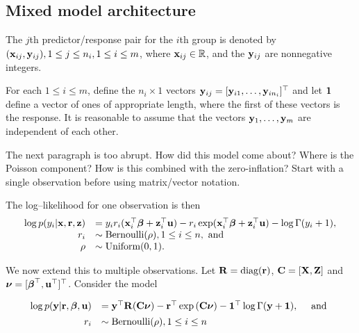 \documentclass[times, doublespace]{anzsauth}
\newcommand{\joc}[1]{{\color{red}#1}}
\begin{document}
\subsection{Mixed model architecture}

The $j$th predictor/response pair for the $i$th group is denoted by $({\bf x}_{ij}, {\bf y}_{ij}), 1 \leq j \leq n_i, 1 \leq i \leq m$, where ${\bf x}_{ij} \in {\mathbb{R}}$, and the ${\bf y}_{ij}$ are nonnegative integers.

\noindent For each $1 \leq i \leq m$, define the $n_i \times 1$ vectors ${\bf y}_{ij} = [{\bf y}_{i 1}, \ldots, {\bf y}_{i
	n_i}]^\top$ and let ${\bf 1}$ define a vector of ones of appropriate length, where the first of these vectors is
the response. It is reasonable to assume that the vectors ${\bf y}_1, \ldots, {\bf y}_m$ are independent of each
other.

\joc{The next paragraph is too abrupt. How did this model come about? Where is the Poisson component? How is this combined with the zero-inflation?
Start with a single observation before using matrix/vector notation.}

\noindent The log--likelihood for one observation is then
\begin{equation*}
	\begin{array}{rl}
		\log p(y_i | {\bf x}, {\bf r}, {\bf z}) & = y_i r_i ({\bf x}_i^\top {\boldsymbol\beta} + {\bf z}_i^\top {\bf u}) - r_i \exp ({\bf x}_i^\top {\boldsymbol\beta} + {\bf z}_i^\top {\bf u}) - \log \Gamma (y_i + 1), \\
		r_i                         & \sim \text{Bernoulli}(\rho), 1 \leq i \leq n, \text{ and }                                                              \\
		\rho                        & \sim \mbox{Uniform}(0, 1).                                                                                              \\
	\end{array}
\end{equation*}

\noindent We now extend this to multiple observations. Let ${\bf R} = \text{diag}{({\bf r})}$, ${\bf C} = [{\bf X}, {\bf Z}]$ and ${\boldsymbol \nu} = [{\boldsymbol \beta}^\top, {\bf u}^\top]^\top$. Consider the model


\begin{equation}\label{eq:main}
	\begin{array}{rl}
		\log{p({\bf y}|{\bf r}, {\boldsymbol\beta}, {\bf u})} & = {\bf y}^\top {\bf R} ({\bf C}{\boldsymbol \nu}) - {\bf r}^\top \exp{({\bf C}{\boldsymbol\nu})} - {\bf 1}^\top \log{\Gamma{({\bf y}+ {\bf1})}}, \quad \mbox{ and } \\ [1ex]
		r_i                           & \sim \text{Bernoulli}(\rho), 1 \leq i \leq n                                                                     \\
	\end{array}
\end{equation}
\end{document}
